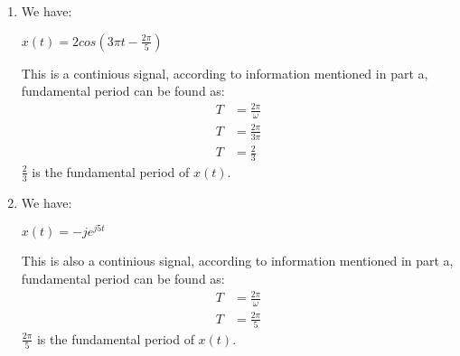 \documentclass[10pt,a4paper, margin=1in]{article}
\begin{document}
\begin{enumerate}
\begin{enumerate}
    \item We have: 
\begin{center}
$x(t) = 2cos(3\pi t - \frac{2\pi}{5})$ 
\end{center}
This is a continious signal, according to information mentioned in part a, fundamental period can be found as:
\begin{align*}
T&=\frac{2\pi}{\omega} \\
T&=\frac{2\pi}{3\pi} \\
T&=\frac{2}{3}
\end{align*}
$\frac{2}{3}$ is the fundamental period of $x(t)$.\\

\newpage

    \item We have: 
\begin{center}
$x(t) = -je^{j5t}$ 
\end{center}
This is also a continious signal, according to information mentioned in part a, fundamental period can be found as:
\begin{align*}
T&=\frac{2\pi}{\omega} \\
T&=\frac{2\pi}{5}
\end{align*}
$\frac{2\pi}{5}$ is the fundamental period of $x(t)$.\\

    \end{enumerate}


\end{enumerate}
\end{document}
